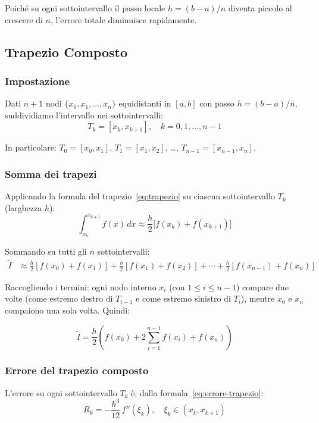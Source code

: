 \documentclass[a4paper,12pt]{article}
\theoremstyle{definition}
\theoremstyle{remark}
\begin{document}
Poiché su ogni sottointervallo il passo locale $h = (b-a)/n$ diventa
piccolo al crescere di $n$, l'errore totale diminuisce rapidamente.

\subsection{Trapezio Composto}

\subsubsection*{Impostazione}

Dati $n+1$ nodi $\{x_0, x_1, \ldots, x_n\}$ equidistanti in $[a,b]$
con passo $h = (b-a)/n$, suddividiamo l'intervallo nei sottointervalli:
\[
  T_k = [x_k, x_{k+1}], \quad k = 0, 1, \ldots, n-1
\]

\noindent In particolare: $T_0 = [x_0,x_1]$, $T_1 = [x_1,x_2]$, \ldots,
$T_{n-1} = [x_{n-1},x_n]$.

\subsubsection*{Somma dei trapezi}

Applicando la formula del trapezio~\eqref{eq:trapezio} su ciascun
sottointervallo $T_k$ (larghezza $h$):
\[
  \int_{x_k}^{x_{k+1}} f(x)\,dx \approx \frac{h}{2}\bigl[f(x_k)+f(x_{k+1})\bigr]
\]

Sommando su tutti gli $n$ sottointervalli:
\begin{align*}
  \tilde{I} &\approx
    \frac{h}{2}[f(x_0)+f(x_1)]
  + \frac{h}{2}[f(x_1)+f(x_2)]
  + \cdots
  + \frac{h}{2}[f(x_{n-1})+f(x_n)]
\end{align*}

Raccogliendo i termini: ogni nodo interno $x_i$ (con $1 \le i \le n-1$)
compare due volte (come estremo destro di $T_{i-1}$ e come estremo
sinistro di $T_i$), mentre $x_0$ e $x_n$ compaiono una sola volta.
Quindi:

\begin{equation}
  \boxed{
    \tilde{I} = \frac{h}{2}\!\left(f(x_0) + 2\sum_{i=1}^{n-1} f(x_i) + f(x_n)\right)
  }
  \label{eq:trapezio-comp}
\end{equation}

\subsubsection*{Errore del trapezio composto}

L'errore su ogni sottointervallo $T_k$ è, dalla formula~\eqref{eq:errore-trapezio}:
\[
  R_k = -\frac{h^3}{12}\,f''(\xi_k), \quad \xi_k \in (x_k, x_{k+1})
\]
\end{document}
